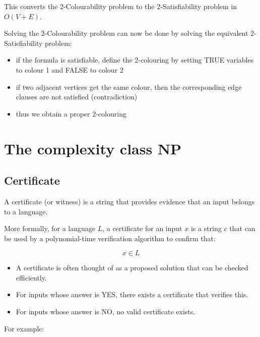 \documentclass[11pt]{article}
\providecommand{\tightlist}{%
      \setlength{\itemsep}{0pt}\setlength{\parskip}{0pt}}
\begin{document}
This converts the 2-Colourability problem to the 2-Satisfiability
problem in \(O(V+E)\).

Solving the 2-Colourability problem can now be done by solving the
equivalent 2-Satisfiability problem:

\begin{itemize}
\tightlist
\item
  if the formula is satisfiable, define the 2-colouring by setting TRUE
  variables to colour 1 and FALSE to colour 2
\item
  if two adjacent vertices get the same colour, then the corresponding
  edge clauses are not satisfied (contradiction)
\item
  thus we obtain a proper 2-colouring
\end{itemize}

    \section{The complexity class NP}\label{the-complexity-class-np}

\subsection{Certificate}\label{certificate}

A certificate (or witness) is a string that provides evidence that an
input belongs to a language.

More formally, for a language \(L\), a certificate for an input \(x\) is
a string \(c\) that can be used by a polynomial-time verification
algorithm to confirm that:

\[ x \in L \]

\begin{itemize}
\tightlist
\item
  A certificate is often thought of as a proposed solution that can be
  checked efficiently.
\item
  For inputs whose answer is YES, there exists a certificate that
  verifies this.
\item
  For inputs whose answer is NO, no valid certificate exists.
\end{itemize}

For example:
\end{document}
